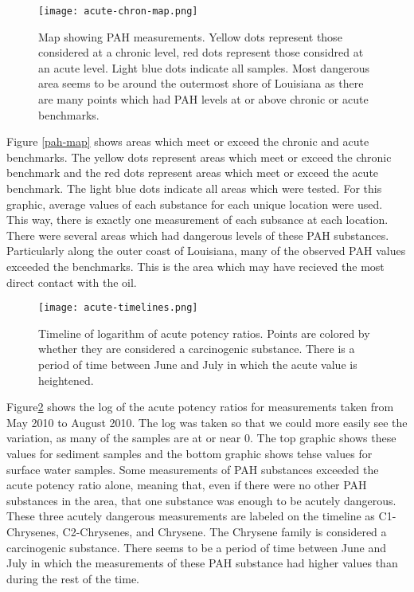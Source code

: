 \documentclass[11pt]{article}
\begin{document}
\begin{figure}[htbp] %
   \centering
   \texttt{[image: acute-chron-map.png]} 
   \caption{Map showing PAH measurements. Yellow dots represent those considered at a chronic level, red dots represent those considred at an acute level.  Light blue dots indicate all samples.  Most dangerous area seems to be around the outermost shore of Louisiana as there are many points which had PAH levels at or above chronic or acute benchmarks.}
   \label{pah-map }
\end{figure}


Figure \ref{pah-map} shows areas which meet or exceed the chronic and acute benchmarks.  The yellow dots represent areas which meet or exceed the chronic benchmark and the red dots represent areas which meet or exceed the acute benchmark.  The light blue dots indicate all areas which were tested.  For this graphic, average values of each substance for each unique location were used.  This way, there is exactly one measurement of each subsance at each location.  There were several areas which had dangerous levels of these PAH substances.  Particularly along the outer coast of Louisiana, many of the observed PAH values exceeded the benchmarks.  This is the area which may have recieved the most direct contact with the oil.  

\begin{figure}[htbp] %
   \centering
   \texttt{[image: acute-timelines.png]} 
   \caption{Timeline of logarithm of acute potency ratios.  Points are colored by whether they are considered a carcinogenic substance. There is a period of time between June and July in which the acute value is heightened.}
   \label{pah-timeline}
\end{figure}


Figure\ref {pah-timeline} shows the log of the acute potency ratios for measurements taken from May 2010 to August 2010. The log was taken so that we could more easily see the variation, as many of the samples are at or near 0. The top graphic shows these values for sediment samples and the bottom graphic shows tehse values for surface water samples.  Some measurements of PAH substances exceeded the acute potency ratio alone, meaning that, even if there were no other PAH substances in the area, that one substance was enough to be acutely dangerous.  These three acutely dangerous measurements are labeled on the timeline as C1-Chrysenes, C2-Chrysenes, and Chrysene.  The Chrysene family is considered a carcinogenic substance.  There seems to be a period of time between June and July in which the measurements of these PAH substance had higher values than during the rest of the time.    
\end{document}
